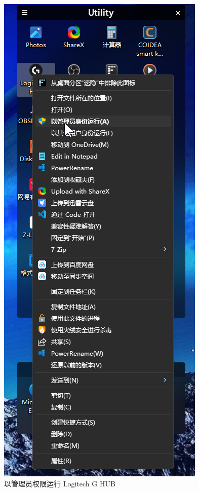 \begin{figure}[H]
    \Centering
    \includegraphics[width=\textwidth]{docs/assets/run_lghub.png}
    \caption{以管理员权限运行 Logitech G HUB}
\end{figure}

